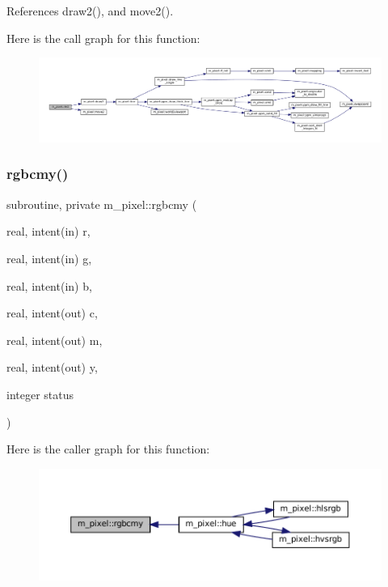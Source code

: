 References draw2(), and move2().

Here is the call graph for this function\+:
\nopagebreak
\begin{figure}[H]
\begin{center}
\leavevmode
\includegraphics[width=350pt]{namespacem__pixel_a5435aa0d9d6048a62c09d7d90665b958_cgraph}
\end{center}
\end{figure}
\mbox{\label{namespacem__pixel_a4dd5383ae0616511d16c996903a971dc}} 
\subsubsection{\texorpdfstring{rgbcmy()}{rgbcmy()}}
{\footnotesize\ttfamily subroutine, private m\+\_\+pixel\+::rgbcmy (\begin{DoxyParamCaption}\item[{real, intent(in)}]{r,  }\item[{real, intent(in)}]{g,  }\item[{real, intent(in)}]{b,  }\item[{real, intent(out)}]{c,  }\item[{real, intent(out)}]{m,  }\item[{real, intent(out)}]{y,  }\item[{integer}]{status }\end{DoxyParamCaption})\hspace{0.3cm}{\ttfamily [private]}}

Here is the caller graph for this function\+:
\nopagebreak
\begin{figure}[H]
\begin{center}
\leavevmode
\includegraphics[width=350pt]{namespacem__pixel_a4dd5383ae0616511d16c996903a971dc_icgraph}
\end{center}
\end{figure}
\mbox{\label{namespacem__pixel_a02bb73b68aeae5056ccf76868146b1b4}} 
